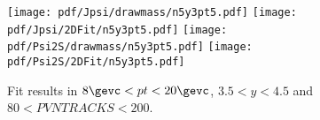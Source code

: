 \begin{figure}[H]
\begin{center}
\texttt{[image: pdf/Jpsi/drawmass/n5y3pt5.pdf]}
\texttt{[image: pdf/Jpsi/2DFit/n5y3pt5.pdf]}
\vspace*{-0.5cm}
\texttt{[image: pdf/Psi2S/drawmass/n5y3pt5.pdf]}
\texttt{[image: pdf/Psi2S/2DFit/n5y3pt5.pdf]}
\vspace*{-0.5cm}
\end{center}
\caption{Fit results in $8\gevc<pt<20\gevc$, $3.5<y<4.5$ and $80<PVNTRACKS<200$.}
\label{Fitn5y3pt5}
\end{figure}
